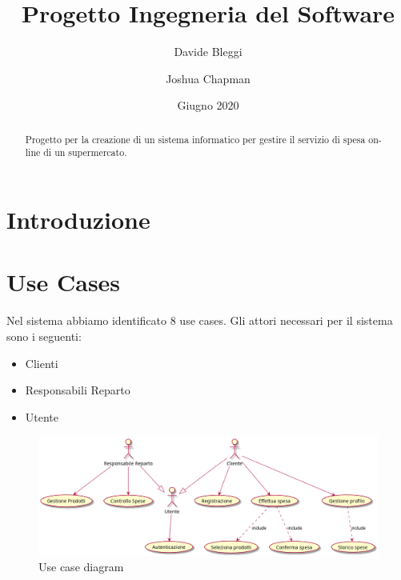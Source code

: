 \documentclass[12pt, a4paper]{article}
\title{Progetto Ingegneria del Software}
\author{Davide Bleggi \and Joshua Chapman}
\date{Giugno 2020}
\numberwithin{equation}{section} %
\begin{document}
\begin{titlepage}
  \maketitle
\end{titlepage}

\begin{abstract}
  Progetto per la creazione di un sistema informatico per gestire il servizio 
  di spesa on-line di un supermercato.
\end{abstract}

\tableofcontents
\newpage

\section{Introduzione}



\section{Use Cases}

Nel sistema abbiamo identificato 8 use cases. Gli attori necessari per il 
sistema sono i seguenti:
\begin{itemize}
  \item Clienti
  \item Responsabili Reparto
  \item Utente
\end{itemize}

\begin{figure}[h]
\centering
\includegraphics[width=\textwidth]{use_case_diagram.png}
\caption{Use case diagram}
\end{figure}
\end{document}
